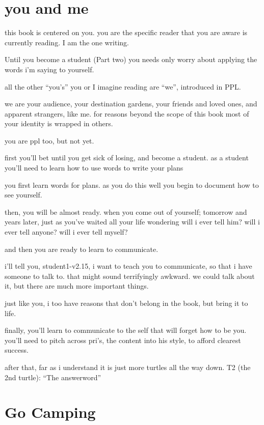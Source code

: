 \documentclass[
]{book}
\begin{document}
\hypertarget{you-and-me}{%
\section{you and me}\label{you-and-me}}

this book is centered on you.
you are the specific reader
that you are aware is currently reading.
I am the one writing.

Until you become a student (Part two)
you needs only worry
about applying the words i'm saying
to yourself.

all the other
``you's'' you or I imagine reading
are ``we'', introduced in PPL.

we are your audience,
your destination gardens,
your friends and loved ones,
and apparent strangers, like me.
for reasons beyond the scope of this book
most of your identity is wrapped in others.

you are ppl too,
but not yet.

first you'll bet until you get sick of losing,
and become a student.
as a student you'll need to
learn how to use words
to write your plans

you first learn words for plans.
as you do this well
you begin to document
how to see yourself.

then, you will be almost ready.
when you come out of yourself;
tomorrow and years later,
just as you've waited all your life wondering
will i ever tell him?
will i ever tell anyone?
will i ever tell myself?

and then
you are ready to learn
to communicate.

i'll tell you,
student1-v2.15,
i want to teach you to communicate,
so that i have someone to talk to.
that might sound
terrifyingly awkward.
we could talk about it, but
there are much more important things.

just like you,
i too have reasons
that don't belong in the book,
but bring it to life.

finally, you'll learn to
communicate to the self
that will forget how to be you.
you'll need to pitch
across pri's, the content
into his style,
to afford clearest success.

after that,
far as i understand
it is just more turtles
all the way down.
T2 (the 2nd turtle):
``The answerword''

\hypertarget{go-camping}{%
\section{Go Camping}\label{go-camping}}
\end{document}
